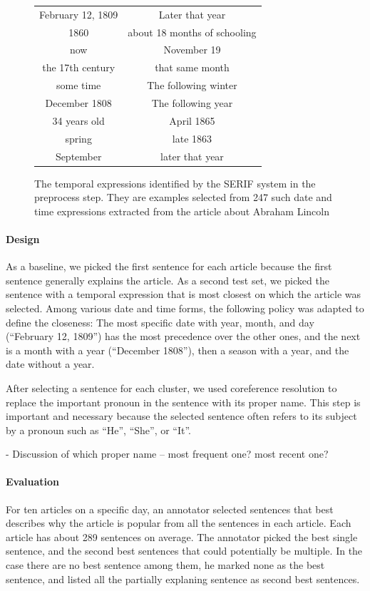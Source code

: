 \documentclass[11pt]{article}
\newcommand{\war}[1]{{\sf\small #1}}
\begin{document}
\begin{figure}
\centering
\begin{tabular}{|c|c|}
\hline
February 12, 1809 & Later that year \\
1860 & about 18 months of schooling \\
now & November 19 \\
the 17th century & that same month \\
some time & The following winter \\
December 1808 & The following year \\
34 years old & April 1865 \\
spring & late 1863 \\
September & later that year \\
\hline
\end{tabular}
\label{fig:temporal-expressions-examples}
\caption{The temporal expressions identified by the SERIF system in the preprocess step. They are examples selected from 247 such date and time expressions extracted from the article about \war{Abraham Lincoln}}
\end{figure}

\paragraph {Design}
As a baseline, we picked the first sentence for each article because the first sentence generally explains the article.
As a second test set, we picked the sentence with a temporal expression that is most closest on which the article was selected.
Among various date and time forms, the following policy was adapted to define the closeness:
The most specific date with year, month, and day (``February 12, 1809'') has the most precedence over the other ones, and the next is a month with a year (``December 1808''), then a season with a year, and the date without a year.

After selecting a sentence for each cluster, we used coreference resolution to replace the important pronoun in the sentence with its proper name.
This step is important and necessary because the selected sentence often refers to its subject by a pronoun such as ``He'', ``She'', or ``It''.

- Discussion of which proper name -- most frequent one? most recent one?

\paragraph {Evaluation}
For ten articles on a specific day, an annotator selected sentences that best describes why the article is popular from all the sentences in each article.
Each article has about 289 sentences on average.
The annotator picked the best single sentence, and the second best sentences that could potentially be multiple.
In the case there are no best sentence among them, he marked none as the best sentence, and listed all the partially explaning sentence as second best sentences.
\end{document}
